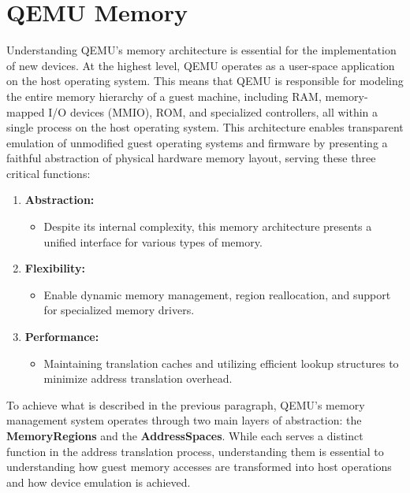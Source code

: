 \section{QEMU Memory }
\label{chap:qemu_memory}

Understanding QEMU's memory architecture is essential for the implementation 
of new devices. At the highest level, QEMU operates as a user-space application on 
the host operating system. This means that QEMU is responsible for modeling the 
entire memory hierarchy of a guest machine, including RAM, memory-mapped I/O 
devices (MMIO), ROM, and specialized controllers, all within a single process on 
the host operating system. This architecture enables transparent emulation of 
unmodified guest operating systems and firmware by presenting a faithful abstraction 
of physical hardware memory layout, serving these three critical functions:

\begin{enumerate}
    \item \textbf{Abstraction:}     
        \begin{itemize}
            \item Despite its internal complexity, this memory architecture presents a 
            unified interface for various types of memory.
        \end{itemize}
    \item \textbf{Flexibility:} 
        \begin{itemize}
            \item Enable dynamic memory management, region reallocation, and support 
            for specialized memory drivers.
        \end{itemize}
    \item \textbf{Performance:} 
        \begin{itemize}
            \item Maintaining translation caches and utilizing efficient lookup structures to 
            minimize address translation overhead.
        \end{itemize}
\end{enumerate}


To achieve what is described in the previous paragraph, QEMU's memory 
management system operates through two main layers of abstraction: the \textbf{MemoryRegions} 
and the \textbf{AddressSpaces}. While each serves a distinct function in the address 
translation process, understanding them is essential to understanding how guest 
memory accesses are transformed into host operations and how device emulation is 
achieved.

